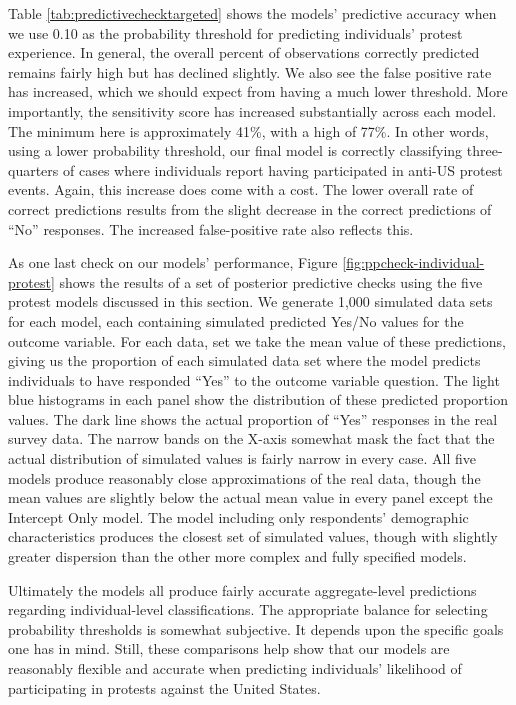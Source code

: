 			
			
			
			Table \ref{tab:predictivechecktargeted} shows the models' predictive accuracy when we use 0.10 as the probability threshold for predicting individuals' protest experience. In general, the overall percent of observations correctly predicted remains fairly high but has declined slightly. We also see the false positive rate has increased, which we should expect from having a much lower threshold. More importantly, the sensitivity score has increased substantially across each model. The minimum here is approximately 41\%, with a high of 77\%. In other words, using a lower probability threshold, our final model is correctly classifying three-quarters of cases where individuals report having participated in anti-US protest events. Again, this increase does come with a cost. The lower overall rate of correct predictions results from the slight decrease in the correct predictions of ``No'' responses. The increased false-positive rate also reflects this. 
			
			As one last check on our models' performance, Figure \ref{fig:ppcheck-individual-protest} shows the results of a set of posterior predictive checks using the five protest models discussed in this section. We generate 1,000 simulated data sets for each model, each containing simulated predicted Yes/No values for the outcome variable. For each data, set we take the mean value of these predictions, giving us the proportion of each simulated data set where the model predicts individuals to have responded ``Yes'' to the outcome variable question. The light blue histograms in each panel show the distribution of these predicted proportion values. The dark line shows the actual proportion of ``Yes'' responses in the real survey data. The narrow bands on the X-axis somewhat mask the fact that the actual distribution of simulated values is fairly narrow in every case. All five models produce reasonably close approximations of the real data, though the mean values are slightly below the actual mean value in every panel except the Intercept Only model. The model including only respondents' demographic characteristics produces the closest set of simulated values, though with slightly greater dispersion than the other more complex and fully specified models. 
			
			Ultimately the models all produce fairly accurate aggregate-level predictions regarding individual-level classifications. The appropriate balance for selecting probability thresholds is somewhat subjective. It depends upon the specific goals one has in mind. Still, these comparisons help show that our models are reasonably flexible and accurate when predicting individuals' likelihood of participating in protests against the United States. 
			
